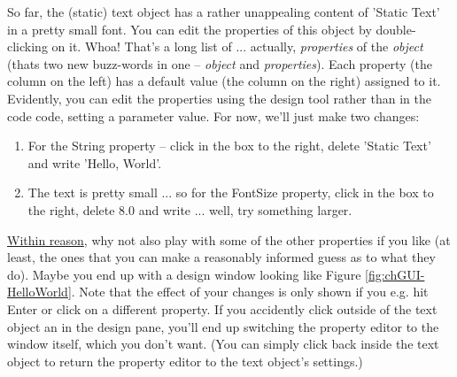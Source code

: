 \documentclass{tufte-book} %
\begin{document}
So far, the (static) text object has a rather unappealing content of '\textsf{Static Text}' in a pretty small font. You can edit the properties of this object by double-clicking on it. Whoa! That's a long list of ... actually, \textit{properties} of the \textit{object} (thats two new buzz-words in one -- \textit{object} and \textit{properties}). Each property (the column on the left) has a default value (the column on the right) assigned to it. Evidently, you can edit the properties using the design tool rather than in the code code, setting a parameter value. For now, we'll just make two changes:
\begin{enumerate}[noitemsep]
\setlength{\itemindent}{.2in}
\item For the \textsf{String} property -- click in the box to the right, delete '\textsf{Static Text}' and write '\textsf{Hello, World}'.
\item The text is pretty small ... so for the \textsf{FontSize} property, click in the box to the right, delete \textsf{8.0} and write ... well, try something larger.
\end{enumerate}

\uline{Within reason}, why not also play with some of the other properties if you like (at least, the ones that you can make a reasonably informed guess as to what they do). Maybe you end up with a design window looking like Figure \ref{fig:chGUI-HelloWorld}. Note that the effect of your changes is only shown if you e.g. hit \textsf{Enter} or click on a different property. If you accidently click outside of the text object an in the design pane, you'll end up switching the property editor to the window itself, which you don't want. (You can simply click back inside the text object to return the property editor to the text object's settings.)
\end{document}
